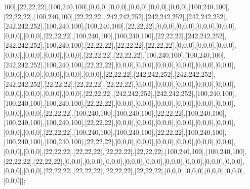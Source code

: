 100],[22,22,22],[100,240,100],[0,0,0],[0,0,0],[0,0,0],[0,0,0],[0,0,0],[100,240,100],[22,22,22],[100,240,100],[22,22,22],[242,242,252],[242,242,252],[242,242,252],[242,242,252],[100,240,100],[100,240,100],[22,22,22],[0,0,0],[0,0,0],[0,0,0],[0,0,0],[0,0,0],[0,0,0],[22,22,22],[100,240,100],[100,240,100],[22,22,22],[242,242,252],[242,242,252],[100,240,100],[22,22,22],[22,22,22],[22,22,22],[0,0,0],[0,0,0],[0,0,0],[0,0,0],[0,0,0],[0,0,0],[0,0,0],[22,22,22],[22,22,22],[100,240,100],[100,240,100],[242,242,252],[100,240,100],[22,22,22],[0,0,0],[0,0,0],[0,0,0],[0,0,0],[0,0,0],[0,0,0],[0,0,0],[0,0,0],[0,0,0],[0,0,0],[0,0,0],[22,22,22],[242,242,252],[242,242,252],[242,242,252],[22,22,22],[22,22,22],[22,22,22],[0,0,0],[0,0,0],[0,0,0],[0,0,0],[0,0,0],[0,0,0],[0,0,0],[0,0,0],[0,0,0],[22,22,22],[242,242,252],[242,242,252],[100,240,100],[100,240,100],[100,240,100],[22,22,22],[0,0,0],[0,0,0],[0,0,0],[0,0,0],[0,0,0],[0,0,0],[0,0,0],[0,0,0],[22,22,22],[100,240,100],[100,240,100],[22,22,22],[100,240,100],[100,240,100],[100,240,100],[22,22,22],[0,0,0],[0,0,0],[0,0,0],[0,0,0],[0,0,0],[0,0,0],[0,0,0],[0,0,0],[22,22,22],[100,240,100],[100,240,100],[22,22,22],[100,240,100],[100,240,100],[100,240,100],[22,22,22],[0,0,0],[0,0,0],[0,0,0],[0,0,0],[0,0,0],[0,0,0],[0,0,0],[0,0,0],[22,22,22],[22,22,22],[22,22,22],[22,22,22],[100,240,100],[100,240,100],[22,22,22],[22,22,22],[0,0,0],[0,0,0],[0,0,0],[0,0,0],[0,0,0],[0,0,0],[0,0,0],[0,0,0],[0,0,0],[0,0,0],[0,0,0],[22,22,22],[22,22,22],[22,22,22],[22,22,22],[0,0,0],[0,0,0],[0,0,0],[0,0,0],[0,0,0]];

